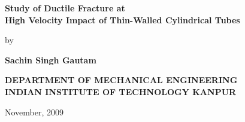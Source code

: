 \titlepage
\begin{center}
\LARGE{\bfseries  Study of Ductile Fracture at
\\ High Velocity Impact of Thin-Walled Cylindrical Tubes} \vspace{1.0in}



\vspace{1.25in}

\normalsize{
by}\\

\vspace{0.35cm}


\Large{\bfseries Sachin Singh Gautam}\\
\vspace{4.0cm}
\begin{figure}[h]
\begin{center}
\end{center}
\end{figure}
\vspace{0.5cm}
\normalsize{\bfseries DEPARTMENT OF MECHANICAL ENGINEERING}\\

\large{\bfseries INDIAN INSTITUTE OF TECHNOLOGY KANPUR}


November, 2009
\end{center}
